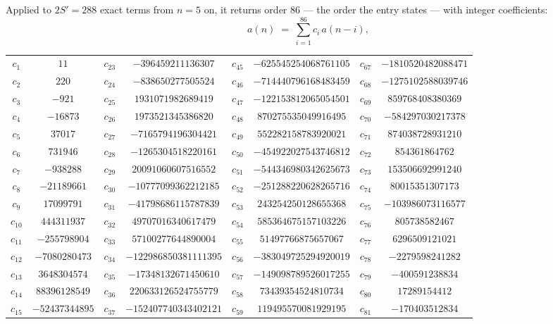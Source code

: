 \documentclass[11pt,a4paper]{article}
\theoremstyle{plain}
\theoremstyle{definition}
\begin{document}
Applied to $2S'=288$ exact terms from $n=5$ on, it returns order $86$ --- the
order the entry states --- with integer coefficients:
\[
a(n)\;=\;\sum_{i=1}^{86}c_i\,a(n-i),
\]
\begin{center}\small
\begin{tabular}{cccccccc}
$c_{1}$ & $11$ & $c_{23}$ & $-396459211136307$ & $c_{45}$ & $-625545254068761105$ & $c_{67}$ & $-1810520482088471$ \\
$c_{2}$ & $220$ & $c_{24}$ & $-838650277505524$ & $c_{46}$ & $-714440796168483459$ & $c_{68}$ & $-1275102588039746$ \\
$c_{3}$ & $-921$ & $c_{25}$ & $1931071982689419$ & $c_{47}$ & $-122153812065054501$ & $c_{69}$ & $859768408380369$ \\
$c_{4}$ & $-16873$ & $c_{26}$ & $1973521345386820$ & $c_{48}$ & $870275535049916495$ & $c_{70}$ & $-584297030217378$ \\
$c_{5}$ & $37017$ & $c_{27}$ & $-7165794196304421$ & $c_{49}$ & $552282158783920021$ & $c_{71}$ & $874038728931210$ \\
$c_{6}$ & $731946$ & $c_{28}$ & $-1265304518220161$ & $c_{50}$ & $-454922027543746812$ & $c_{72}$ & $854361864762$ \\
$c_{7}$ & $-938288$ & $c_{29}$ & $20091060607516552$ & $c_{51}$ & $-544346980342625673$ & $c_{73}$ & $153506692991240$ \\
$c_{8}$ & $-21189661$ & $c_{30}$ & $-10777099362212185$ & $c_{52}$ & $-251288220628265716$ & $c_{74}$ & $80015351307173$ \\
$c_{9}$ & $17099791$ & $c_{31}$ & $-41798686115787839$ & $c_{53}$ & $243254250128655368$ & $c_{75}$ & $-103986073116577$ \\
$c_{10}$ & $444311937$ & $c_{32}$ & $49707016340617479$ & $c_{54}$ & $585364675157103226$ & $c_{76}$ & $805738582467$ \\
$c_{11}$ & $-255798904$ & $c_{33}$ & $57100277644890004$ & $c_{55}$ & $51497766875657067$ & $c_{77}$ & $6296509121021$ \\
$c_{12}$ & $-7080280473$ & $c_{34}$ & $-122986850381111395$ & $c_{56}$ & $-383049725294920019$ & $c_{78}$ & $-2279598241282$ \\
$c_{13}$ & $3648304574$ & $c_{35}$ & $-17348132671450610$ & $c_{57}$ & $-149098789526017255$ & $c_{79}$ & $-400591238834$ \\
$c_{14}$ & $88396128549$ & $c_{36}$ & $220633126524755779$ & $c_{58}$ & $73439354524810734$ & $c_{80}$ & $17289154412$ \\
$c_{15}$ & $-52437344895$ & $c_{37}$ & $-152407740343402121$ & $c_{59}$ & $119495570081929195$ & $c_{81}$ & $-170403512834$ \\

\end{tabular}
\end{center}
\end{document}
